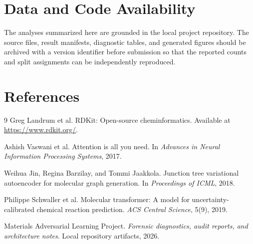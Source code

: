 \documentclass[11pt]{article}
\begin{document}
\section*{Data and Code Availability}
The analyses summarized here are grounded in the local project repository. The
source files, result manifests, diagnostic tables, and generated figures should
be archived with a version identifier before submission so that the reported
counts and split assignments can be independently reproduced.

\section*{References}
\begin{thebibliography}{9}
Greg Landrum et al. RDKit: Open-source cheminformatics. Available at
\url{https://www.rdkit.org/}.

Ashish Vaswani et al. Attention is all you need. In \emph{Advances in Neural
Information Processing Systems}, 2017.

Weihua Jin, Regina Barzilay, and Tommi Jaakkola. Junction tree variational
autoencoder for molecular graph generation. In \emph{Proceedings of ICML},
2018.

Philippe Schwaller et al. Molecular transformer: A model for uncertainty-
calibrated chemical reaction prediction. \emph{ACS Central Science}, 5(9),
2019.

Materials Adversarial Learning Project. \emph{Forensic diagnostics, audit
reports, and architecture notes}. Local repository artifacts, 2026.
\end{thebibliography}
\end{document}
